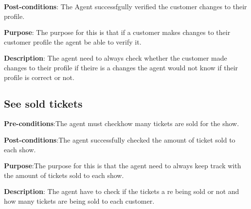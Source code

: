 \textbf{Post-conditions}: The Agent successfgully verified the customer changes to their profile.

\textbf{Purpose}: The purpose for this is that if a customer makes changes to their customer profile the agent be able to verify it.

\textbf{Description}: The agent need to always check whether the customer made changes to their profile if theire is a changes the agent would not know if their profile is correct or not.

\subsection{See sold tickets}
\textbf{Pre-conditions}:The agent must checkhow many tickets are sold for the show.

\textbf{Post-conditions}:The agent successfully checked the amount of ticket sold to each show.

\textbf{Purpose}:The purpose for this is that the agent need to always keep track with the amount of tickets sold to each show.

\textbf{Description}: The agent have to check if the tickets a re being sold or not and how many tickets are being sold to each customer.
